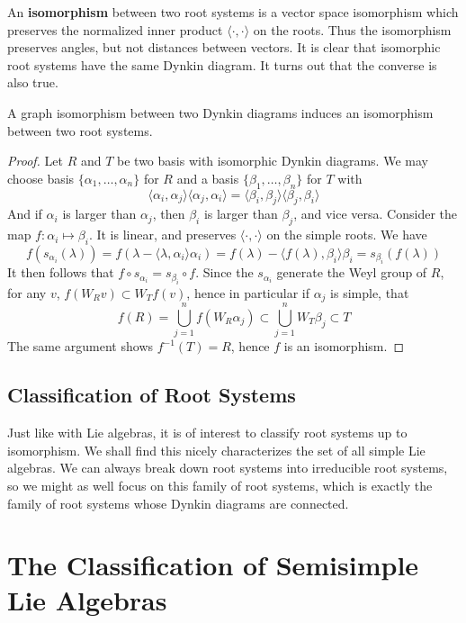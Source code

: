 An {\bf isomorphism} between two root systems is a vector space isomorphism which preserves the normalized inner product $\langle \cdot, \cdot \rangle$ on the roots. Thus the isomorphism preserves angles, but not distances between vectors. It is clear that isomorphic root systems have the same Dynkin diagram. It turns out that the converse is also true.

\begin{theorem}
    A graph isomorphism between two Dynkin diagrams induces an isomorphism between two root systems.
\end{theorem}
\begin{proof}
    Let $R$ and $T$ be two basis with isomorphic Dynkin diagrams. We may choose basis $\{ \alpha_1, \dots, \alpha_n \}$ for $R$ and a basis $\{ \beta_1, \dots, \beta_n \}$ for $T$ with
    \[ \langle \alpha_i, \alpha_j \rangle \langle \alpha_j, \alpha_i \rangle = \langle \beta_i, \beta_j \rangle \langle \beta_j, \beta_i \rangle \]
    And if $\alpha_i$ is larger than $\alpha_j$, then $\beta_i$ is larger than $\beta_j$, and vice versa. Consider the map $f: \alpha_i \mapsto \beta_i$. It is linear, and preserves $\langle \cdot, \cdot \rangle$ on the simple roots. We have
    \[ f(s_{\alpha_i}(\lambda)) = f(\lambda - \langle \lambda, \alpha_i \rangle \alpha_i) = f(\lambda) - \langle f(\lambda), \beta_i \rangle \beta_i = s_{\beta_i}(f(\lambda)) \]
    It then follows that $f \circ s_{\alpha_i} = s_{\beta_i} \circ f$. Since the $s_{\alpha_i}$ generate the Weyl group of $R$, for any $v$, $f(W_Rv) \subset W_T f(v)$, hence in particular if $\alpha_j$ is simple, that
    \[ f(R) = \bigcup_{j = 1}^n f(W_R \alpha_j) \subset \bigcup_{j = 1}^n W_T \beta_j \subset T \]
    The same argument shows $f^{-1}(T) = R$, hence $f$ is an isomorphism.
\end{proof}

\section{Classification of Root Systems}

Just like with Lie algebras, it is of interest to classify root systems up to isomorphism. We shall find this nicely characterizes the set of all simple Lie algebras. We can always break down root systems into irreducible root systems, so we might as well focus on this family of root systems, which is exactly the family of root systems whose Dynkin diagrams are connected.

\chapter{The Classification of Semisimple Lie Algebras}


